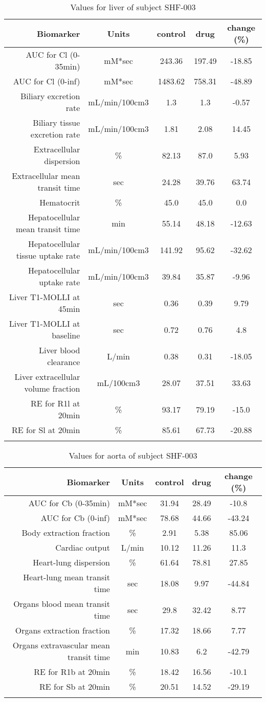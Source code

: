\documentclass{epflreport}%
\begin{document}
%
\clearpage%
\begin{longtable}{rcccc}%
\hline%
Biomarker&Units&control&drug&change (\%)\\%
\hline%
AUC for Cl (0{-}35min)&mM*sec&243.36&197.49&{-}18.85\\%
AUC for Cl (0{-}inf)&mM*sec&1483.62&758.31&{-}48.89\\%
Biliary excretion rate&mL/min/100cm3&1.3&1.3&{-}0.57\\%
Biliary tissue excretion rate&mL/min/100cm3&1.81&2.08&14.45\\%
Extracellular dispersion&\%&82.13&87.0&5.93\\%
Extracellular mean transit time&sec&24.28&39.76&63.74\\%
Hematocrit&\%&45.0&45.0&0.0\\%
Hepatocellular mean transit time&min&55.14&48.18&{-}12.63\\%
Hepatocellular tissue uptake rate&mL/min/100cm3&141.92&95.62&{-}32.62\\%
Hepatocellular uptake rate&mL/min/100cm3&39.84&35.87&{-}9.96\\%
Liver T1{-}MOLLI at 45min&sec&0.36&0.39&9.79\\%
Liver T1{-}MOLLI at baseline&sec&0.72&0.76&4.8\\%
Liver blood clearance&L/min&0.38&0.31&{-}18.05\\%
Liver extracellular volume fraction&mL/100cm3&28.07&37.51&33.63\\%
RE for R1l at 20min&\%&93.17&79.19&{-}15.0\\%
RE for Sl at 20min&\%&85.61&67.73&{-}20.88\\%
\hline%
\caption{Values for liver of subject SHF-003} \\%
\end{longtable}%
\begin{longtable}{rcccc}%
\hline%
Biomarker&Units&control&drug&change (\%)\\%
\hline%
AUC for Cb (0{-}35min)&mM*sec&31.94&28.49&{-}10.8\\%
AUC for Cb (0{-}inf)&mM*sec&78.68&44.66&{-}43.24\\%
Body extraction fraction&\%&2.91&5.38&85.06\\%
Cardiac output&L/min&10.12&11.26&11.3\\%
Heart{-}lung dispersion&\%&61.64&78.81&27.85\\%
Heart{-}lung mean transit time&sec&18.08&9.97&{-}44.84\\%
Organs blood mean transit time&sec&29.8&32.42&8.77\\%
Organs extraction fraction&\%&17.32&18.66&7.77\\%
Organs extravascular mean transit time&min&10.83&6.2&{-}42.79\\%
RE for R1b at 20min&\%&18.42&16.56&{-}10.1\\%
RE for Sb at 20min&\%&20.51&14.52&{-}29.19\\%
\hline%
\caption{Values for aorta of subject SHF-003} \\%
\end{longtable}%
\clearpage%
\end{document}
